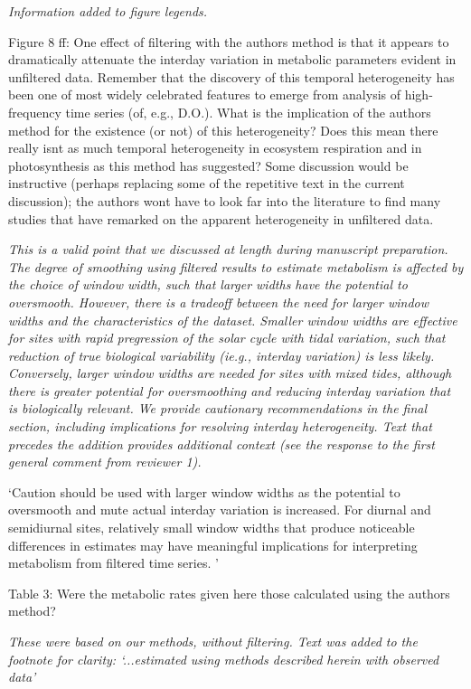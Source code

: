 \documentclass[letterpaper,12pt]{article}\usepackage[]{graphicx}\usepackage[]{color}
\begin{document}
{\it Information added to figure legends.}
 
Figure 8 ff: One effect of filtering with the authors method is that it appears to dramatically attenuate the interday variation in metabolic parameters evident in unfiltered data. Remember that the discovery of this temporal heterogeneity has been one of most widely celebrated features to emerge from analysis of high-frequency time series (of, e.g., D.O.). What is the implication of the authors method for the existence (or not) of this heterogeneity? Does this mean there really isnt as much temporal heterogeneity in ecosystem respiration and in photosynthesis as this method has suggested? Some discussion would be instructive (perhaps
replacing some of the repetitive text in the current discussion); the authors wont have to look far into the literature to find many studies that have remarked on the apparent heterogeneity in unfiltered data.

{\it This is a valid point that we discussed at length during manuscript preparation.  The degree of smoothing using filtered results to estimate metabolism is affected by the choice of window width, such that larger widths have the potential to oversmooth.  However, there is a tradeoff between the need for larger window widths and the characteristics of the dataset.  Smaller window widths are effective for sites with rapid pregression of the solar cycle with tidal variation, such that reduction of true biological variability (ie.g., interday variation) is less likely.  Conversely, larger window widths are needed for sites with mixed tides, although there is greater potential for oversmoothing and reducing interday variation that is biologically relevant. We provide cautionary recommendations in the final section, including implications for resolving interday heterogeneity. Text that precedes the addition provides additional context (see the response to the first general comment from reviewer 1).

`Caution should be used with larger window widths as the potential to oversmooth and mute actual interday variation is increased.  For diurnal and semidiurnal sites, relatively small window widths that produce noticeable differences in estimates may have meaningful implications for interpreting metabolism from filtered time series. '}

Table 3: Were the metabolic rates given here those calculated using the authors method?

{\it These were based on our methods, without filtering.  Text was added to the footnote for clarity: `...estimated using methods described herein with observed data'}
\end{document}
